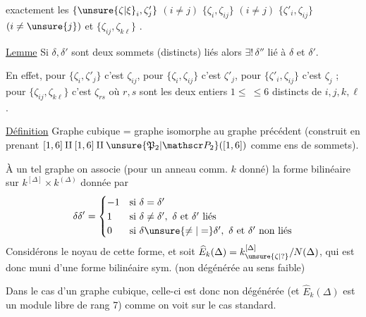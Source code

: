 exactement les $\{\unsure{\zeta|\xi}_i,\zeta'_j\}$ $(i\ne j)$ $\{\zeta_i,\zeta_{ij}\}$ $(i\ne j)$ $\{\zeta'_i,\zeta_{ij}\}$ $(i\ne\unsure{j})$ et $\{\zeta_{ij},\zeta_{k\ell}\}$ . 

\uline{Lemme} Si $\delta,\delta'$ sont deux sommets (distincts) liés alors $\exists!\,\delta''$ lié à $\delta$ et $\delta'$.

En effet, pour $\{\zeta_i,\zeta'_j\}$ c'est $\zeta_{ij}$, pour $\{\zeta_i,\zeta_{ij}\}$ c'est $\zeta'_j$, pour $\{\zeta'_i,\zeta_{ij}\}$ c'est $\zeta_j$ ; pour $\{\zeta_{ij},\zeta_{k\ell}\}$ c'est $\zeta_{rs}$ où $r,s$ sont les deux entiers $1\le\ \le6$ distincts de $i,j,k,\ell$.

\uline{Définition} Graphe cubique = graphe isomorphe au graphe  précédent (construit en prenant  $[1,6]\amalg[1,6]\amalg\unsure{\mathfrak P_2|\mathscr P_2}([1,6])$ comme ens de sommets).

À un tel graphe  on associe (pour un anneau comm. $k$ donné) la forme bilinéaire  sur $k^{[\Delta]}\times k^{(\Delta)}$ donnée par
\[
\delta\delta'=\begin{cases}
-1&\text{si }\delta=\delta'\\
1&\text{si }\delta\ne\delta',\ \delta\text{ et }\delta'\text{ liés}\\
0&\text{si }\delta\unsure{\ne|=}\delta',\ \delta\text{ et }\delta'\text{ non liés}
\end{cases}
\]
Considérons le noyau  de cette forme, et soit $\widehat E_k(\Delta)=k_{\unsure{\zeta|?}}^{[\Delta]}/N(\Delta)$, qui est donc muni d'une forme bilinéaire sym. (non dégénérée au sens faible)

Dans le cas d'un graphe cubique, celle-ci est donc non dégénérée (et $\widehat E_k(\Delta)$ est un module libre de rang 7) comme on voit sur le cas standard.
